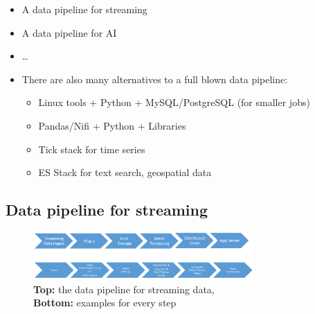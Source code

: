 \documentclass{article}
\begin{document}
\begin{itemize}
    \item A data pipeline for streaming
    \item A data pipeline for AI
    \item \dots
    \item There are also many alternatives to a full blown data pipeline:
    \begin{itemize}
        \item Linux tools + Python + MySQL/PostgreSQL (for smaller jobs)
        \item Pandas/Nifi + Python + Libraries
        \item Tick stack for time series
        \item ES Stack for text search, geospatial data
    \end{itemize}
\end{itemize}

\subsection{Data pipeline for streaming}

\begin{figure}[H]
    \centering
    \includegraphics[width=0.75\textwidth]{datapipelines-streaming.png}
    \caption{\textbf{Top:} the data pipeline for streaming data,\\ \textbf{Bottom:} examples for every step}
\end{figure}
\end{document}
